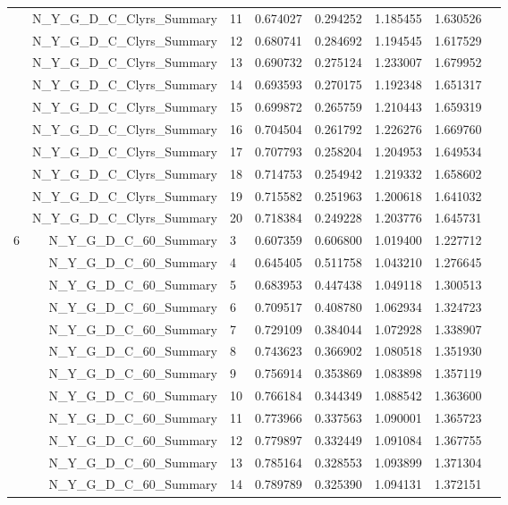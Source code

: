 \documentclass[a4paper,12pt]{article}
\begin{document}
\begin{center}
\begin{longtable}{lrlrrrrr}
& N\_Y\_G\_D\_C\_Clyrs\_Summary & 11 & 0.674027 & 0.294252 & 1.185455 & 1.630526 \\
& N\_Y\_G\_D\_C\_Clyrs\_Summary & 12 & 0.680741 & 0.284692 & 1.194545 & 1.617529 \\
& N\_Y\_G\_D\_C\_Clyrs\_Summary & 13 & 0.690732 & 0.275124 & 1.233007 & 1.679952 \\
& N\_Y\_G\_D\_C\_Clyrs\_Summary & 14 & 0.693593 & 0.270175 & 1.192348 & 1.651317 \\
& N\_Y\_G\_D\_C\_Clyrs\_Summary & 15 & 0.699872 & 0.265759 & 1.210443 & 1.659319 \\
& N\_Y\_G\_D\_C\_Clyrs\_Summary & 16 & 0.704504 & 0.261792 & 1.226276 & 1.669760 \\
& N\_Y\_G\_D\_C\_Clyrs\_Summary & 17 & 0.707793 & 0.258204 & 1.204953 & 1.649534 \\
& N\_Y\_G\_D\_C\_Clyrs\_Summary & 18 & 0.714753 & 0.254942 & 1.219332 & 1.658602 \\
& N\_Y\_G\_D\_C\_Clyrs\_Summary & 19 & 0.715582 & 0.251963 & 1.200618 & 1.641032 \\
& N\_Y\_G\_D\_C\_Clyrs\_Summary & 20 & 0.718384 & 0.249228 & 1.203776 & 1.645731 \\ \hline
\multirow{18}{1cm}{6}  & N\_Y\_G\_D\_C\_60\_Summary & 3 & 0.607359 & 0.606800 & 1.019400 & 1.227712 \\
& N\_Y\_G\_D\_C\_60\_Summary & 4 & 0.645405 & 0.511758 & 1.043210 & 1.276645 \\
& N\_Y\_G\_D\_C\_60\_Summary & 5 & 0.683953 & 0.447438 & 1.049118 & 1.300513 \\
& N\_Y\_G\_D\_C\_60\_Summary & 6 & 0.709517 & 0.408780 & 1.062934 & 1.324723 \\
& N\_Y\_G\_D\_C\_60\_Summary & 7 & 0.729109 & 0.384044 & 1.072928 & 1.338907 \\
& N\_Y\_G\_D\_C\_60\_Summary & 8 & 0.743623 & 0.366902 & 1.080518 & 1.351930 \\
& N\_Y\_G\_D\_C\_60\_Summary & 9 & 0.756914 & 0.353869 & 1.083898 & 1.357119 \\
& N\_Y\_G\_D\_C\_60\_Summary & 10 & 0.766184 & 0.344349 & 1.088542 & 1.363600 \\
& N\_Y\_G\_D\_C\_60\_Summary & 11 & 0.773966 & 0.337563 & 1.090001 & 1.365723 \\
& N\_Y\_G\_D\_C\_60\_Summary & 12 & 0.779897 & 0.332449 & 1.091084 & 1.367755 \\
& N\_Y\_G\_D\_C\_60\_Summary & 13 & 0.785164 & 0.328553 & 1.093899 & 1.371304 \\
& N\_Y\_G\_D\_C\_60\_Summary & 14 & 0.789789 & 0.325390 & 1.094131 & 1.372151 \\

\end{longtable}
\end{center}
\end{document}
